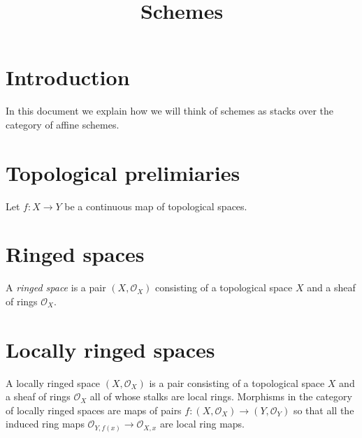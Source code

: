 

%


\title{Schemes}


\maketitle

\tableofcontents

\section{Introduction}
\label{section-introduction}

\noindent
In this document we explain how we will think of schemes as stacks over the
category of affine schemes.

\section{Topological prelimiaries}
\label{section-preliminaries}

\noindent
Let $f : X \to Y$ be a continuous map of topological spaces.


\section{Ringed spaces}
\label{section-ringed-spaces}

\begin{definition}
\label{definition-ringed-space}
A {\it ringed space} is a pair $(X, \mathcal{O}_X)$
consisting of a topological space $X$ and a sheaf of rings
$\mathcal{O}_X$.
\end{definition}

\section{Locally ringed spaces}
\label{section-locally-ringed-spaces}

A locally ringed space $(X,\mathcal{O}_X)$ is a pair consisting of a
topological space $X$ and a sheaf of rings $\mathcal{O}_X$ all of whose stalks
are local rings. Morphisms in the category of locally ringed spaces are
maps of pairs $f : (X, \mathcal{O}_X) \to (Y,\mathcal{O}_Y)$ so that
all the induced ring maps $\mathcal{O}_{Y,f(x)} \to \mathcal{O}_{X,x}$ are
local ring maps.

